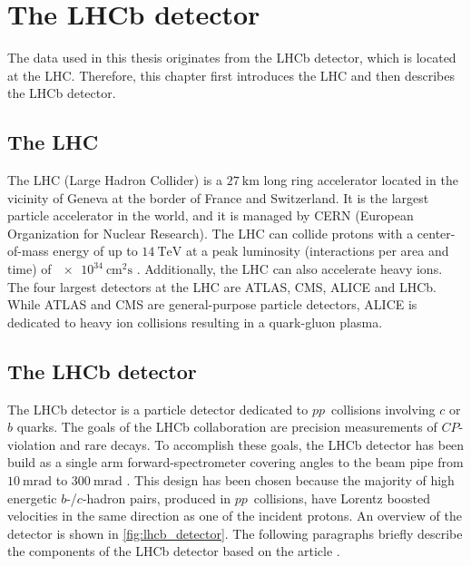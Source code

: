 \chapter{The LHCb detector}

The data used in this thesis originates from the LHCb detector, which is located at the LHC.
Therefore, this chapter first introduces the LHC and then describes the LHCb detector.

\section{The LHC}

The LHC (Large Hadron Collider) is a $\qty{27}{\km}$ long ring accelerator located in the vicinity of Geneva at the border of France and Switzerland. 
It is the largest particle accelerator in the world, and it is managed by CERN (European Organization for Nuclear Research).
The LHC can collide protons with a center-of-mass energy of up to $\qty{14}{\TeV}$ at a peak luminosity (interactions per area and time) of $\qty{e34}{\cm\squared\s}$ \cite{LHC}.
Additionally, the LHC can also accelerate heavy ions.
The four largest detectors at the LHC are ATLAS, CMS, ALICE and LHCb.
While ATLAS and CMS are general-purpose particle detectors, ALICE is dedicated to heavy ion collisions resulting in a quark-gluon plasma.

\section{The LHCb detector}

The LHCb detector is a particle detector dedicated to $pp$~collisions involving $c$ or $b$ quarks.
The goals of the LHCb collaboration are precision measurements of $C\!P$-violation and rare decays. 
To accomplish these goals, the LHCb detector has been build as a single arm forward-spectrometer covering angles to the beam pipe from $\qty{10}{\milli\radian}$ to $\qty{300}{\milli\radian}$ \cite{LHCb}. 
This design has been chosen because the majority of high energetic $b$-/$c$-hadron pairs, produced in $pp$~collisions, have Lorentz boosted velocities in the same direction as one of the incident protons.
An overview of the detector is shown in \cref{fig:lhcb_detector}.
The following paragraphs briefly describe the components of the LHCb detector based on the article \cite{LHCb}.

